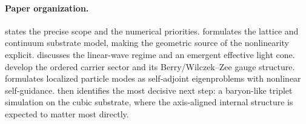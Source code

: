 \paragraph{Paper organization.}
 states the precise scope and the numerical priorities.
 formulates the lattice and continuum substrate model, making the geometric source of the
nonlinearity explicit.
 discusses the linear-wave regime and an emergent effective light cone.
 develop the ordered carrier sector and its Berry/Wilczek--Zee gauge structure.
 formulates localized particle modes as self-adjoint eigenproblems with nonlinear self-guidance.
 then identifies the most decisive next step: a baryon-like triplet simulation on the cubic
substrate, where the axis-aligned internal structure is expected to matter most directly.
